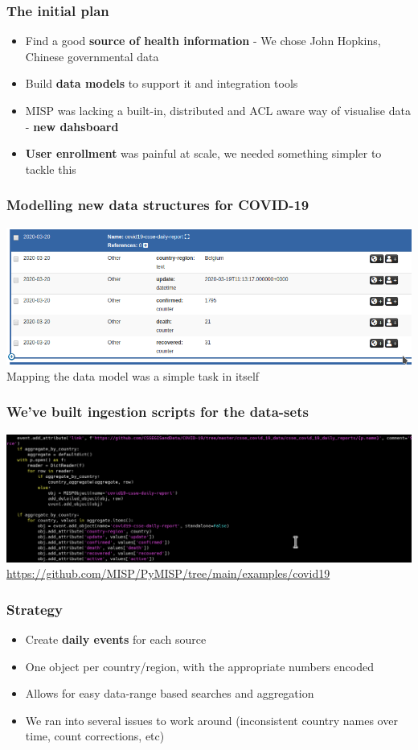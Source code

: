 \begin{frame}
 \frametitle{The initial plan}
 \begin{itemize}
         \item Find a good {\bf source of health information} - We chose John Hopkins, Chinese governmental data
         \item Build {\bf data models} to support it and integration tools
         \item MISP was lacking a built-in, distributed and ACL aware way of visualise data - {\bf new dahsboard}
         \item {\bf User enrollment} was painful at scale, we needed something simpler to tackle this
 \end{itemize}
\end{frame}

\begin{frame}
    \frametitle{Modelling new data structures for COVID-19}
    \includegraphics[width=1.00\linewidth]{covidobject.png}
    Mapping the data model was a simple task in itself
\end{frame}

\begin{frame}
    \frametitle{We've built ingestion scripts for the data-sets}
    \includegraphics[width=1.00\linewidth]{johnhopkins.png}
    \url{https://github.com/MISP/PyMISP/tree/main/examples/covid19}
\end{frame}

\begin{frame}
    \frametitle{Strategy}
 \begin{itemize}
         \item Create {\bf daily events} for each source
         \item One object per country/region, with the appropriate numbers encoded
         \item Allows for easy data-range based searches and aggregation
         \item We ran into several issues to work around (inconsistent country names over time, count corrections, etc)
 \end{itemize}
\end{frame}

